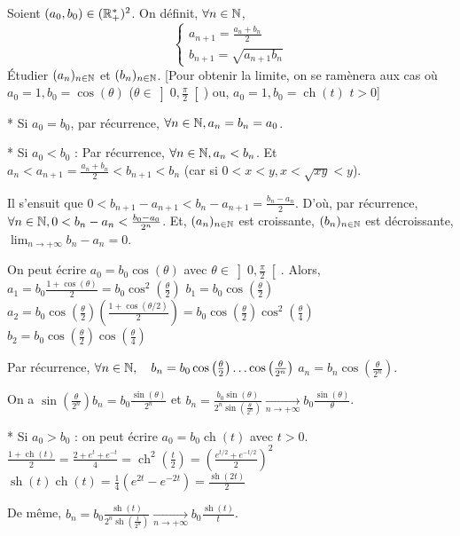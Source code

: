 
\begin{statementbox}
Soient $(a_0, b_0) \in (\mathbb R_+^*)^2$. On définit, $\forall n \in \mathbb N$,
\[
\begin{cases}
a_{n+1} = \frac{a_n+b_n}{2} \\
b_{n+1} = \sqrt{a_{n+1}b_n}
\end{cases}
\]
Étudier $(a_n)_{n \in \mathbb N}$ et $(b_n)_{n \in \mathbb N}$. [Pour obtenir la limite, on se ramènera aux cas où $a_0 = 1, b_0 = \cos(\theta)$ ($\theta \in \left]0, \frac{\pi}{2}\right[$) ou, $a_0 = 1, b_0 = \operatorname{ch}(t)$ $t > 0$]
\end{statementbox}

\begin{solution}
* Si $a_0 = b_0$, par récurrence, $\forall n \in \mathbb N, a_n = b_n = a_0$.

* Si $a_0 < b_0$ :
Par récurrence, $\forall n \in \mathbb N, a_n < b_n$.
Et $a_n < a_{n+1} = \frac{a_n+b_n}{2} < b_{n+1} < b_n$
(car si $0 < x < y, x < \sqrt{xy} < y$).

Il s'ensuit que $0 < b_{n+1} - a_{n+1} < b_n - a_{n+1} = \frac{b_n - a_n}{2}$.
D'où, par récurrence, $\forall n \in \mathbb N, 0 < b_n - a_n < \frac{b_0 - a_0}{2^n}$.
Et, $(a_n)_{n \in \mathbb N}$ est croissante, $(b_n)_{n \in \mathbb N}$ est décroissante, $\lim_{n \to +\infty} b_n - a_n = 0$.

On peut écrire $a_0 = b_0 \cos(\theta)$ avec $\theta \in \left] 0, \frac{\pi}{2} \right[$.
Alors, $a_1 = b_0 \frac{1+\cos(\theta)}{2} = b_0 \cos^2\left(\frac{\theta}{2}\right)$
$b_1 = b_0 \cos\left(\frac{\theta}{2}\right)$
$a_2 = b_0 \cos\left(\frac{\theta}{2}\right) \left(\frac{1+\cos(\theta/2)}{2}\right) = b_0 \cos\left(\frac{\theta}{2}\right) \cos^2\left(\frac{\theta}{4}\right)$
$b_2 = b_0 \cos\left(\frac{\theta}{2}\right) \cos\left(\frac{\theta}{4}\right)$

Par récurrence, $\forall n \in \mathbb N, \quad b_n = b_0 \cos\left(\frac{\theta}{2}\right) \dots \cos\left(\frac{\theta}{2^n}\right)$
$a_n = b_n \cos\left(\frac{\theta}{2^n}\right)$.

On a $\sin\left(\frac{\theta}{2^n}\right) b_n = b_0 \frac{\sin(\theta)}{2^n}$ et $b_n = \frac{b_0 \sin(\theta)}{2^n \sin\left(\frac{\theta}{2^n}\right)} \xrightarrow[n \to +\infty]{} b_0 \frac{\sin(\theta)}{\theta}$.

* Si $a_0 > b_0$ : on peut écrire $a_0 = b_0 \operatorname{ch}(t)$ avec $t > 0$.
$\frac{1+\operatorname{ch}(t)}{2} = \frac{2 + e^t + e^{-t}}{4} = \operatorname{ch}^2\left(\frac{t}{2}\right) = \left(\frac{e^{t/2} + e^{-t/2}}{2}\right)^2$
$\operatorname{sh}(t) \operatorname{ch}(t) = \frac{1}{4} (e^{2t} - e^{-2t}) = \frac{\operatorname{sh}(2t)}{2}$

De même, $b_n = b_0 \frac{\operatorname{sh}(t)}{2^n \operatorname{sh}\left(\frac{t}{2^n}\right)} \xrightarrow[n \to +\infty]{} b_0 \frac{\operatorname{sh}(t)}{t}$.
\end{solution}

